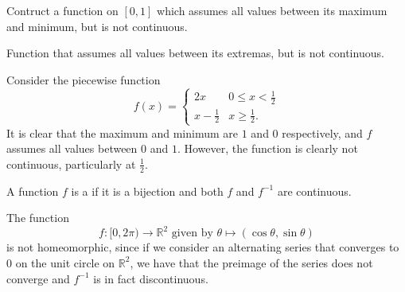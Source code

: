 \documentclass[notoc,notitlepage]{tufte-book}
\begin{document}
\begin{ex}
  Contruct a function on $[0, 1]$ which assumes all values between its maximum and minimum, but is not continuous.
\end{ex}

\begin{solution}
  \begin{marginfigure}
    \centering
    \caption{Function that assumes all values between its extremas, but is not continuous.}\label{fig:function_that_assumes_all_values_between_its_extremas_but_is_not_continuous_}
  \end{marginfigure}
  Consider the piecewise function
  \begin{equation*}
    f(x) = \begin{cases}
      2x & 0 \leq x < \frac{1}{2} \\
      x - \frac{1}{2} & x \geq \frac{1}{2}.
    \end{cases}
  \end{equation*}
  It is clear that the maximum and minimum are $1$ and $0$ respectively, and $f$
  assumes all values between $0$ and $1$. However, the function is
  clearly not continuous, particularly at $\frac{1}{2}$.
\end{solution}

\begin{defn}[Homeomorphism]\label{defn:homeomorphism}
  A function $f$ is a  if it is a bijection and both $f$ and $f^{-1}$ are continuous.
\end{defn}

\begin{eg}
  The function
  \begin{equation*}
    f : [ 0, 2\pi ) \to \mathbb{R}^2 \text{ given by } \theta \mapsto (\cos \theta, \sin \theta)
  \end{equation*}
  is not homeomorphic, since if we consider an alternating series that converges to $0$ on the unit circle on $\mathbb{R}^2$, we have that the preimage of the series does not converge and $f^{-1}$ is in fact discontinuous.
\end{eg}
\end{document}
